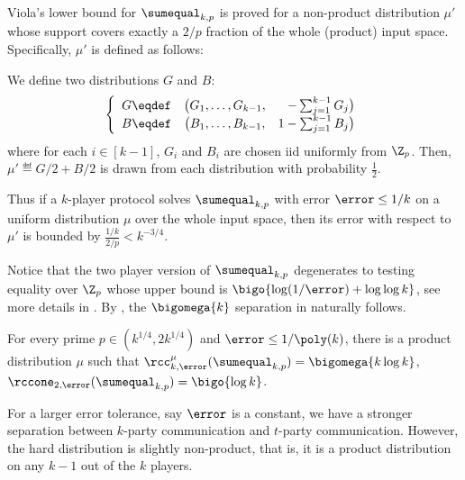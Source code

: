 \begin{remark}
\label{remark:Viola}
Viola's lower bound for $\sumequal_{k,p}$ is proved for a non-product distribution $\mu'$ whose support covers exactly a $2/p$ fraction of the whole (product) input  space. Specifically, $\mu'$ is defined as follows:
\begin{definition}
\label{def:Viola_Distribution}
We define two distributions $G$ and $B$:
		\[
			\left\{
			\begin{array}{c c r}
				G \eqdef &	\big( G_1,\dots, G_{k-1} , &-\sum_{j=1}^{k-1} G_j \big)		\\
				B \eqdef &  \big( B_1,\dots, B_{k-1} , &1-\sum_{j=1}^{k-1} B_j \big)
			\end{array}		
			\right.
		\]
%
where for each $i \in [k-1]$, $G_i$ and $B_i$ are chosen iid uniformly from $\Z_p$. Then, $\mu' \eqdef G/2 + B/2$ is drawn from each distribution with probability $\frac{1}{2}$.
\end{definition}
Thus if a $k$-player protocol solves $\sumequal_{k,p}$ with error $\error\le 1/k$ on a uniform distribution $\mu$ over the whole input space,
then its error with respect to $\mu'$ is bounded by $\frac{1/k}{2/p}< k^{-3/4}$.
\end{remark}
Notice that the two player version of $\sumequal_{k,p}$ degenerates to testing equality over $\Z_p$ whose upper bound is $\bigo{\log(1/\error)+\log\log k}$,
see more details in .
By , the $\bigomega{k}$ separation in  naturally follows.

\begin{corollary}\label{corollary:lower bound}
	For every prime $p\in(k^{1/4},2k^{1/4})$ and $\error\le 1/\poly(k)$, there is a product distribution $\mu$ such that $\rcc_{k,\error}^{\mu}(\sumequal_{k,p}) = \bigomega{k\log k}$,
	$\rccone_{2,\error}(\sumequal_{k,p}) = \bigo{\log k}$.
\end{corollary}


For a larger error tolerance, say $\error$ is a constant, we have a stronger separation between $k$-party communication and $t$-party communication. However, the hard distribution is slightly non-product, that is, it is a product distribution on any $k-1$ out of the $k$ players. 


